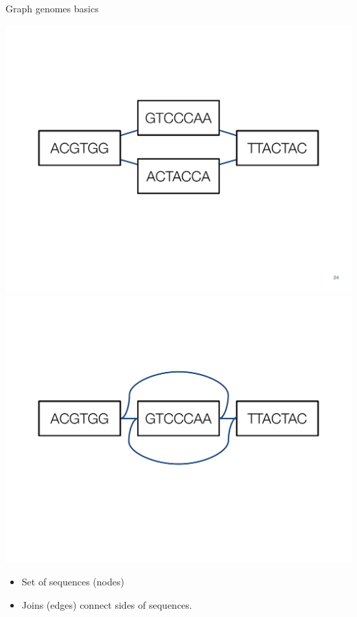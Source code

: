 \documentclass[10pt,
               hyperref={bookmarks=false,
                         bookmarksopen=false,
                         colorlinks=true,
                         linkcolor=blue,
                         urlcolor=blue},
               xcolor={svgnames,table}]{beamer}
\begin{document}
\begin{frame}{Graph genomes basics}
  \begin{center}
    \includegraphics[scale=0.30]{images/graph-genome-alt.pdf} \\
    \includegraphics[scale=0.30]{images/graph-genome-inversion.pdf}
  \end{center}
  \begin{itemize}
  \item Set of sequences (nodes)
  \item Joins (edges) connect sides of sequences.
  \end{itemize}
\end{frame}
\end{document}
